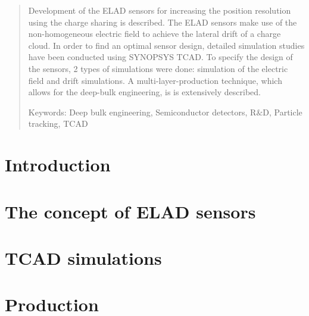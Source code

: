 \documentclass[a4paper,10pt]{article}
\newcommand*{\notFOREPJ}{}%
\begin{document}
\begin{abstract}
\noindent

Development of the ELAD sensors for increasing the position resolution using the charge sharing is described. The ELAD sensors make use of the non-homogeneous electric field to achieve the lateral drift of a charge cloud. In order to find an optimal sensor design, detailed simulation studies have been conducted using SYNOPSYS TCAD. To specify the design of the sensors,  2 types of simulations were done: simulation of the electric field and drift simulations. A multi-layer-production technique, which allows for the deep-bulk engineering, is is extensively described.  



\noindent
Keywords: Deep bulk engineering, Semiconductor detectors, R$\&$D, Particle tracking, TCAD %

\end{abstract}


\section{Introduction}
\label{sec:intro}
\ifdefined\notFOREPJ

\else
 
\fi
% 
%  
%  

\section{The concept of ELAD sensors}
\label{sec:concept}
\ifdefined\notFOREPJ

\else
 
\fi

\section{TCAD simulations}
\label{sec:simulations}
\ifdefined\notFOREPJ
 
\else
 
\fi


\section{Production}
\label{sec:production}
\ifdefined\notFOREPJ
 
\else
 
\fi
\end{document}
